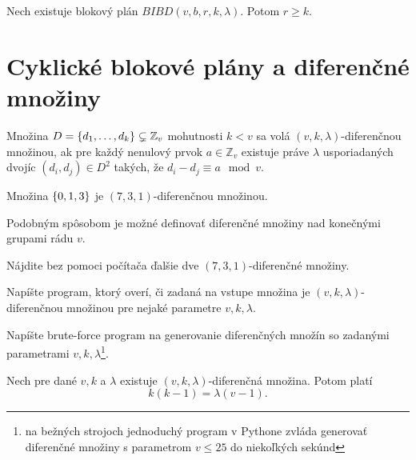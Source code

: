 \begin{corollary}
Nech existuje blokový plán $BIBD(v, b,r, k, \lambda)$. Potom $r \geq k$.
\end{corollary}

\section{Cyklické blokové plány a diferenčné množiny}

\begin{definition}

Množina $D = \left\{d_1, \ldots, d_k\right\} \subsetneq \mathbb{Z}_v$ mohutnosti $k < v$ sa volá $(v, k, \lambda)$-diferenčnou množinou, ak 
pre každý nenulový prvok $a \in \mathbb{Z}_v$ existuje práve $\lambda$ usporiadaných dvojíc $(d_i, d_j) \in D^2$ takých, že
$d_i - d_j \equiv a \mod v$. 
\end{definition}

\begin{remark}

Množina $\left\{0, 1, 3\right\}$ je $(7, 3, 1)$-diferenčnou množinou.

\end{remark}

\begin{remark}

Podobným spôsobom je možné definovať diferenčné množiny nad konečnými grupami rádu $v$.

\end{remark}



\begin{exercise}
Nájdite bez pomoci počítača ďalšie dve $(7, 3, 1)$-diferenčné množiny.
\end{exercise}

\begin{exercise}
Napíšte program, ktorý overí, či zadaná na vstupe množina je $(v, k, \lambda)$-diferenčnou množinou pre nejaké parametre $v, k, \lambda$.
\end{exercise}

\begin{exercise}
Napíšte brute-force program na generovanie diferenčných množín so zadanými parametrami $v, k, \lambda$\footnote{na bežných strojoch jednoduchý program v Pythone zvláda generovať diferenčné množiny s parametrom $ v \leq 25$ do niekoľkých sekúnd}.
\end{exercise}



\begin{lemma}
\label{lem:dffset_counts}
Nech pre dané $v, k$ a $\lambda$ existuje $(v,k,\lambda)$-diferenčná množina. Potom platí $$k(k-1) = \lambda(v-1).$$
\end{lemma}

